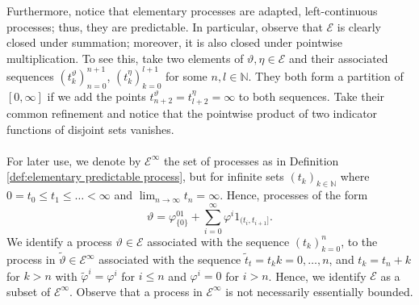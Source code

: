 \documentclass[11pt,a4paper,twoside,openany]{report}
\numberwithin{equation}{section}
\theoremstyle{plain} %
\theoremstyle{definition} %
\theoremstyle{remark} %
\begin{document}
Furthermore, notice that elementary processes are adapted, left-continuous processes; thus, they are predictable. In particular, observe that \(\mathcal{E}\) is clearly closed under summation; moreover, it is also closed under pointwise multiplication. To see this, take two elements of \(\vartheta,\eta\in\mathcal{E}\) and their associated sequences \((t^\vartheta_k)_{n=0}^{n+1}\), \((t^\eta_k)_{k=0}^{l+1}\) for some \(n,l\in\mathbb{N}\). They both form a partition of \([0,\infty]\) if we add the points \(t^{\vartheta
}_{n+2}=t^{\eta}_{l+2}=\infty\) to both sequences. Take their common refinement and notice that the pointwise product of two indicator functions of disjoint sets vanishes.
\\\\
For later use, we denote by \(\mathcal{E}^{\infty}\) the set of processes as in Definition \ref{def:elementary predictable process}, but for infinite sets \((t_k)_{k\in\mathbb{N}}\) where \(0=t_0\leq t_1\leq\dots<\infty\) and \(\lim_{n\to\infty}t_n=\infty\). Hence, processes of the form 
\begin{equation*}
      \vartheta = \varphi^01_{\{0\}}+\sum_{i= 0}^\infty \varphi^i1_{(t_i,t_{i+1}]}.
\end{equation*}
We identify a process \(\vartheta\in\mathcal{E}\) associated with the sequence \((t_k)_{k=0}^n\), to the process in \(\widetilde{\vartheta}\in\mathcal{E}^{\infty}\) associated with the sequence \(\tilde{t}_t=t_k k=0,\dots,n\), and \(t_k = t_n+k\) for \(k>n\) with \(\widetilde{\varphi}^i=\varphi^i\) for \(i\leq n\) and \(\varphi^i=0\) for \(i>n\). Hence, we identify \(\mathcal{E}\) as a subset of \(\mathcal{E}^{\infty}\). Observe that a process in \(\mathcal{E}^{\infty}\) is not necessarily essentially bounded. 
\end{document}
